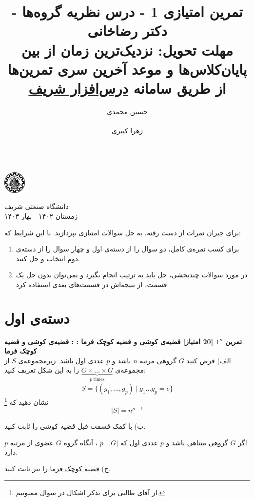 \documentclass{article}
\title{
	\vspace{-0.8em}
تمرین امتیازی 1 - درس نظریه گروه‌ها - دکتر رضاخانی
\\
{\normalsize
\textbf{مهلت تحویل:
نزدیک‌ترین زمان از بین پایان‌کلاس‌ها و موعد آخرین سری تمرین‌ها
\\
\vspace{-0.4em}
از طریق سامانه
\href{https://cw.sharif.edu/}{درس‌افزار شریف}
}
}
\vspace{-0.6em}
}
\author{
حسین محمدی\\
  \lr{
  		\href{mailto:hossein.mohammadi.00427@gmail.com}{\texttt{	hossein.mohammadi.00427@gmail.com}}} \\
  \And
  زهرا کبیری\\
 \lr{
  		\href{mailto:kabiri.zahra98@gmail.com}{ \texttt{kabiri.zahra98@gmail.com}}}\\
  }
\newenvironment{exercise}[3][\unskip]{%
	\par
	\noindent
	\textbf{تمرین
		#1
		[#2 امتیاز] 
		\def\temp{#3}\ifx\temp\empty
		: 
		\else
		: #3 \vspace{0.5em} \\ \noindent
		\fi
}}{}
\begin{document}
\begin{minipage}{0.1\textwidth}%
\includegraphics[width=1.1cm]{sharif-logo.png}
\end{minipage}%
\hfill%
\begin{minipage}{0.9\textwidth}\raggedleft
دانشگاه صنعتی شریف\\
زمستان ۱۴۰۲ - بهار ۱۴۰۳\\
\end{minipage}

\makepertitle

\noindent
برای جبران نمرات از دست رفته، به حل سوالات امتیازی بپردازید. با این شرایط که:
\begin{enumerate}
	\item برای کسب نمره‌ی کامل، دو سوال را  از دسته‌ی اول و چهار سوال را از دسته‌ی دوم انتخاب و حل کنید. 
	\item در مورد سوالات چندبخشی، حل باید به ترتیب انجام بگیرد و نمی‌توان بدون حل یک قسمت، از نتیجه‌اش در قسمت‌های بعدی استفاده کرد. 
	
\end{enumerate}

\section*{
	\LARGE
	دسته‌ی اول}

\begin{exercise}[$1''$]{20}{قضیه‌ی کوشی و قضیه کوچک فرما}
	الف) فرض کنید 
	$G$ گروهی مرتبه 
	$n$ باشد و 
	$p$
	عددی اول باشد. زیرمجموعه‌ی $S$ از مجموعه‌ی
	$\underbrace{G\times \dots \times G}_{p \; \text{times}} $
	را به این شکل تعریف کنید:
	\[
	S = \{(g_1,\dots,g_p) \; \big| \; g_1\dots g_p =e\}
	\]
	نشان دهید که
	\footnote{از آقای طالبی برای تذکر اشکال در سوال ممنونیم.} 
	\[
	|S| = n^{p-1}
	\]
	
	\noindent
	ب) با کمک قسمت قبل قضیه کوشی
	را ثابت کنید. 
	\begin{mdframed}
		اگر $G$ گروهی متناهی باشد و $p$ عددی اول که 
		$p \;| \;|G|$
		، آنگاه گروه $G$ عضوی از مرتبه $p$ دارد.
	\end{mdframed}
	
	\noindent
	ج) 
	\href{https://fa.wikipedia.org/wiki/%D9%82%D8%B6%DB%8C%D9%87_%DA%A9%D9%88%DA%86%DA%A9_%D9%81%D8%B1%D9%85%D8%A7}{قضیه کوچک فرما}
	را نیز ثابت کنید.
\end{exercise}
\end{document}

